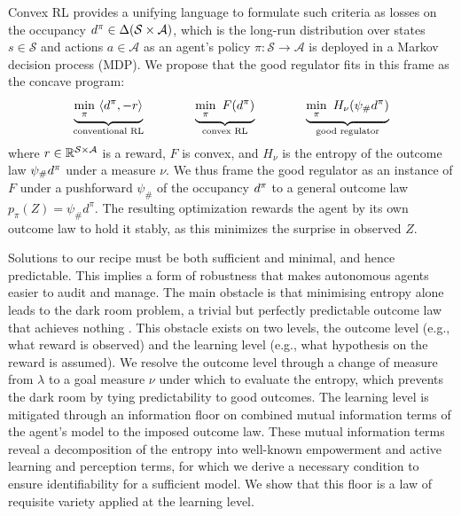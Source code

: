 Convex RL \citep{Zahavy-reward21,Mutti-convex23} provides a unifying language to formulate such criteria as losses on the occupancy $d^{\pi} \in \Delta(\mathcal S \times \mathcal A)$, which is the long-run distribution over states $s \in \mathcal S$ and actions $a \in \mathcal A$ as an agent's policy $\pi: \mathcal S \rightarrow \mathcal A$ is deployed in a Markov decision process (MDP).
We propose that the good regulator fits in this frame as the concave program:
\begin{equation*}
  \underbrace{\min_{\pi}\ \langle d^{\pi}, -r \rangle}_{\text{conventional RL}}
  \qquad\qquad
  \underbrace{\min_{\pi}\ F(d^{\pi})}_{\text{convex RL}}
  \qquad\qquad
  \underbrace{\min_{\pi}\ H_\nu(\psi_\# d^{\pi})}_{\text{good regulator}}
\end{equation*}
where $r \in \mathbb R^{\mathcal S \times \mathcal A}$ is a reward, $F$ is convex, and $H_\nu$ is the entropy of the outcome law $\psi_\# d^{\pi}$ under a measure $\nu$.
We thus frame the good regulator as an instance of $F$ under a pushforward $\psi_\#$ of the occupancy $d^{\pi}$ to a general outcome law $p_\pi(Z) = \psi_\# d^\pi$.
The resulting optimization rewards the agent by its own outcome law to hold it stably, as this minimizes the surprise in observed $Z$.


Solutions to our recipe must be both sufficient and minimal, and hence predictable.
This implies a form of robustness that makes autonomous agents easier to audit and manage.
The main obstacle is that minimising entropy alone leads to the dark room problem, a trivial but perfectly predictable outcome law that achieves nothing \citep{Friston-dark12, Berseth-smirl21}.
This obstacle exists on two levels, the outcome level (e.g., what reward is observed) and the learning level (e.g., what hypothesis on the reward is assumed).
We resolve the outcome level through a change of measure from $\lambda$ to a goal measure $\nu$ under which to evaluate the entropy, which prevents the dark room by tying predictability to good outcomes.
The learning level is mitigated through an information floor on combined mutual information terms of the agent's model to the imposed outcome law.
These mutual information terms reveal a decomposition of the entropy into well-known empowerment \citep{Klyubin-all05, Ivashkov-smwm26} and active learning and perception \citep{MacKay-informationbased92, Bajcsy-active88} terms, for which we derive a necessary condition to ensure identifiability for a sufficient model.
We show that this floor is a law of requisite variety \citep{Ashby-introduction56} applied at the learning level.


